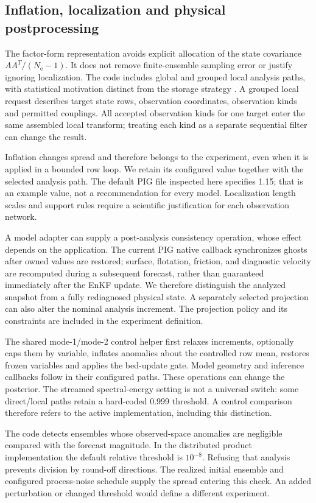 \documentclass[11pt,a4paper]{article}
\newcommand{\Ne}{N_{\mathrm e}}
\begin{document}
\subsection{Inflation, localization and physical postprocessing}
The factor-form representation avoids explicit allocation of the state covariance \(AA^T/(\Ne-1)\). It does not remove finite-ensemble sampling error or justify ignoring localization. The code includes global and grouped local analysis paths, with statistical motivation distinct from the storage strategy \citep{gaspari1999,hunt2007}. A grouped local request describes target state rows, observation coordinates, observation kinds and permitted couplings. All accepted observation kinds for one target enter the same assembled local transform; treating each kind as a separate sequential filter can change the result.

Inflation changes spread and therefore belongs to the experiment, even when it is applied in a bounded row loop. We retain its configured value together with the selected analysis path. The default PIG file inspected here specifies 1.15; that is an example value, not a recommendation for every model. Localization length scales and support rules require a scientific justification for each observation network.

A model adapter can supply a post-analysis consistency operation, whose effect depends on the application. The current PIG native callback synchronizes ghosts after owned values are restored; surface, flotation, friction, and diagnostic velocity are recomputed during a subsequent forecast, rather than guaranteed immediately after the EnKF update. We therefore distinguish the analyzed snapshot from a fully rediagnosed physical state. A separately selected projection can also alter the nominal analysis increment. The projection policy and its constraints are included in the experiment definition.

The shared mode-1/mode-2 control helper first relaxes increments, optionally caps them by variable, inflates anomalies about the controlled row mean, restores frozen variables and applies the bed-update gate. Model geometry and inference callbacks follow in their configured paths. These operations can change the posterior. The streamed spectral-energy setting is not a universal switch: some direct/local paths retain a hard-coded 0.999 threshold. A control comparison therefore refers to the active implementation, including this distinction.

The code detects ensembles whose observed-space anomalies are negligible compared with the forecast magnitude. In the distributed product implementation the default relative threshold is \(10^{-8}\). Refusing that analysis prevents division by round-off directions. The realized initial ensemble and configured process-noise schedule supply the spread entering this check. An added perturbation or changed threshold would define a different experiment.
\end{document}
